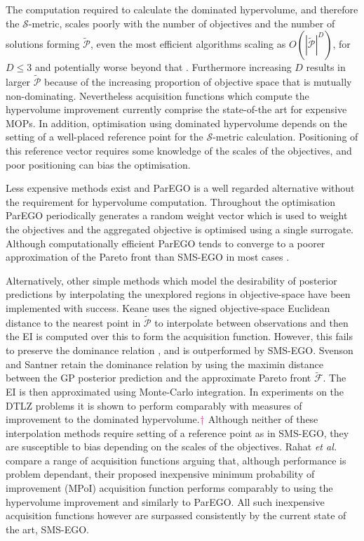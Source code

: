 \documentclass[conference]{IEEEtran}
\makeatletter
\newcommand\hpv{dominated hypervolume\xspace}
\newcommand\smsego{SMS-EGO\xspace}
\newcommand\parego{ParEGO\xspace}
\newcommand\ei{EI\xspace}
\newcommand\gp{GP\xspace}
\newcommand\Papprox{\tilde{\mathcal{P}}}
\newcommand\Fapprox{\tilde{\mathcal{F}}}
\newcommand{\rmenote}[2][\textcolor{magenta}{\dagger}]{$#1$\marginpar{\color{magenta}\raggedright\tiny$#1$ #2}}
\newcommand*{\etal}{\textit{et al.}\@\xspace}
\makeatother
\begin{document}
The computation required to calculate the \hpv, and therefore the $\mathcal{S}$-metric, scales poorly with the number of objectives and the number of solutions forming $\Papprox$,  even the most efficient algorithms scaling as $O(|\Papprox|^D)$,  for $D \le 3$ and potentially worse beyond that \cite{hupkens2014faster}. Furthermore increasing $D$ results in larger $\Papprox$ because of the increasing proportion of objective space that is mutually non-dominating. 
 Nevertheless acquisition functions which compute the hypervolume improvement currently comprise the state-of-the art for expensive MOPs. In addition, optimisation using \hpv depends on the setting of a well-placed reference point for the $\mathcal{S}$-metric calculation. Positioning of this reference vector requires some knowledge of the scales of the objectives, and poor positioning can bias the optimisation. 

Less expensive methods exist and \parego \cite{knowles2006parego} is a well regarded alternative without the requirement for hypervolume computation. Throughout the optimisation \parego periodically generates a random weight vector which is used to weight the objectives and  the aggregated objective is optimised using a single surrogate. Although computationally efficient \parego tends to converge to a poorer approximation of the Pareto front than \smsego in most cases \cite{ponweiser2008multiobjective}.

Alternatively, other simple methods which model the desirability of posterior predictions by interpolating the unexplored regions in objective-space have been implemented with success. Keane \cite{keane2006statistical} uses the signed objective-space Euclidean distance to the nearest point in $\Papprox$ to interpolate between observations and then the \ei is computed over this to form the acquisition function. However, 
this fails to preserve the dominance relation \cite{wagner2010expected}, and is outperformed by \smsego. Svenson and Santner  \cite{svenson2016multiobjective} retain the dominance relation by using the maximin distance between the \gp posterior prediction and the approximate Pareto front  $\Fapprox$. The \ei is then approximated using Monte-Carlo integration. In experiments on the DTLZ problems \cite{deb2005scalable} it is shown to perform comparably with measures of improvement to the \hpv.\rmenote{Perform comparably with what? Reference?}
Although neither of these interpolation methods require setting of a reference point as in \smsego, they are susceptible to bias depending on the scales of the objectives. Rahat \etal \cite{rahat2017alternative} compare a range of acquisition functions arguing that, although performance is problem dependant, their proposed inexpensive minimum probability of improvement (MPoI) acquisition function performs comparably to using the hypervolume improvement and similarly to ParEGO. All such inexpensive acquisition functions however are surpassed consistently by the current state of the art, \smsego.
\end{document}
